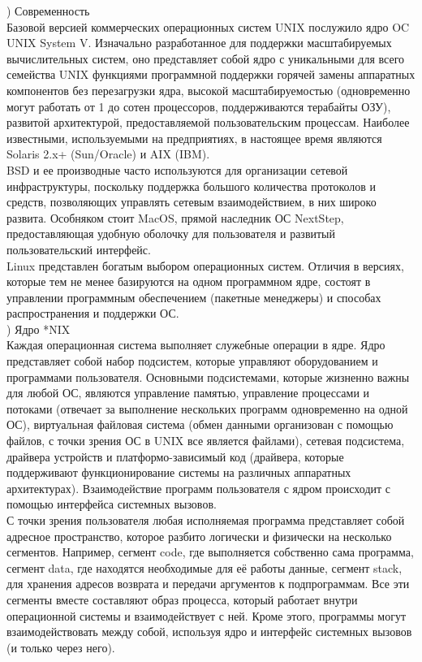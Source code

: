 ) Современность \\
Базовой версией коммерческих операционных систем UNIX послужило ядро OC UNIX System V. Изначально разработанное для поддержки масштабируемых вычислительных систем, оно представляет собой ядро с уникальными для всего семейства UNIX функциями программной поддержки горячей замены аппаратных компонентов без перезагрузки ядра, высокой масштабируемостью (одновременно могут работать от 1 до сотен процессоров, поддерживаются терабайты ОЗУ), развитой архитектурой, предоставляемой пользовательским процессам. Наиболее известными, используемыми на предприятиях, в настоящее время являются Solaris 2.x+ (Sun/Oracle) и AIX (IBM). \\
BSD и ее производные часто используются для организации сетевой инфраструктуры, поскольку поддержка большого количества протоколов и средств, позволяющих управлять сетевым взаимодействием, в них широко развита. Особняком стоит MacOS, прямой наследник ОС NextStep, предоставляющая удобную оболочку для пользователя и развитый пользовательский интерфейс. \\
Linux представлен богатым выбором операционных систем. Отличия в версиях, которые тем не менее базируются на одном программном ядре, состоят в управлении программным обеспечением (пакетные менеджеры) и способах распространения и поддержки ОС. \\

) Ядро *NIX \\
Каждая операционная система выполняет служебные операции в ядре. Ядро представляет собой набор подсистем, которые управляют оборудованием и программами пользователя. Основными подсистемами, которые жизненно важны для любой ОС, являются управление памятью, управление процессами и потоками (отвечает за выполнение нескольких программ одновременно на одной ОС), виртуальная файловая система (обмен данными организован с помощью файлов, с точки зрения ОС в UNIX все является файлами), сетевая подсистема, драйвера устройств и платформо-зависимый код (драйвера, которые поддерживают функционирование системы на различных аппаратных архитектурах). Взаимодействие программ пользователя с ядром происходит с помощью интерфейса
системных вызовов. \\
С точки зрения пользователя любая исполняемая программа представляет собой адресное пространство, которое разбито логически и физически на несколько сегментов. Например, сегмент code, где выполняется собственно сама программа, сегмент data, где находятся необходимые для её работы данные, сегмент stack, для хранения адресов возврата и передачи аргументов к подпрограммам. Все эти сегменты вместе составляют образ процесса, который работает внутри операционной системы и взаимодействует с ней.
Кроме этого, программы могут взаимодействовать между собой, используя ядро и интерфейс системных вызовов (и только через него). \\

